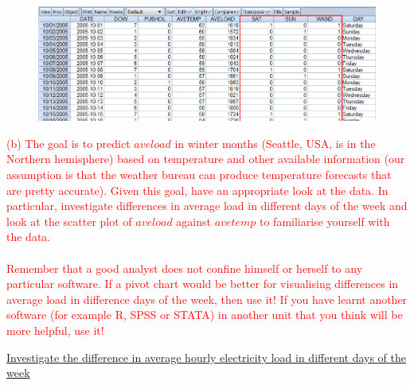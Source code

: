 \documentclass[12pt]{report}
\begin{document}
\vspace{-\baselineskip}
\begin{figure}[H]
	\centerline{\includegraphics{q1_4}}
\end{figure}

\newpage
\noindent \textcolor{red}
{
	(b) The goal is to predict $aveload$ in winter months (Seattle, USA, is in the Northern hemisphere) based on temperature and other available information (our assumption is that the weather bureau can produce temperature forecasts that are pretty accurate). Given this goal, have an appropriate look at the data. In particular, investigate differences in average load in different days of the week and look at the scatter plot of $aveload$ against $avetemp$ to familiarise yourself with the data. \\ \\ Remember that a good analyst does not confine himself or herself to any particular software. If a pivot chart would be better for visualising differences in average load in difference days of the week, then use it! If you have learnt another software (for example R, SPSS or STATA) in another unit that you think will be more helpful, use it!
}

\noindent \uline{Investigate the difference in average hourly electricity load in different days of the week}
\end{document}
